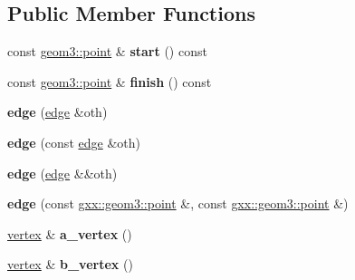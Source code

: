 \subsection*{Public Member Functions}
\begin{DoxyCompactItemize}
\item 
const \hyperlink{classgxx_1_1geom3_1_1point}{geom3\+::point} \& {\bfseries start} () const \hypertarget{classgxx_1_1topo_1_1edge_ae09c1e3d060f65a56834a53b79f34228}{}\label{classgxx_1_1topo_1_1edge_ae09c1e3d060f65a56834a53b79f34228}

\item 
const \hyperlink{classgxx_1_1geom3_1_1point}{geom3\+::point} \& {\bfseries finish} () const \hypertarget{classgxx_1_1topo_1_1edge_ae830c7645360da61e7ed4e8800b5c88b}{}\label{classgxx_1_1topo_1_1edge_ae830c7645360da61e7ed4e8800b5c88b}

\item 
{\bfseries edge} (\hyperlink{classgxx_1_1topo_1_1edge}{edge} \&oth)\hypertarget{classgxx_1_1topo_1_1edge_a4eac7d48227699ac0123224c16bde4d0}{}\label{classgxx_1_1topo_1_1edge_a4eac7d48227699ac0123224c16bde4d0}

\item 
{\bfseries edge} (const \hyperlink{classgxx_1_1topo_1_1edge}{edge} \&oth)\hypertarget{classgxx_1_1topo_1_1edge_aae36929460667329695131fbc85fcabc}{}\label{classgxx_1_1topo_1_1edge_aae36929460667329695131fbc85fcabc}

\item 
{\bfseries edge} (\hyperlink{classgxx_1_1topo_1_1edge}{edge} \&\&oth)\hypertarget{classgxx_1_1topo_1_1edge_a2efc46bf181954bbbf1ba7aef08f0bb5}{}\label{classgxx_1_1topo_1_1edge_a2efc46bf181954bbbf1ba7aef08f0bb5}

\item 
{\bfseries edge} (const \hyperlink{classgxx_1_1geom3_1_1point}{gxx\+::geom3\+::point} \&, const \hyperlink{classgxx_1_1geom3_1_1point}{gxx\+::geom3\+::point} \&)\hypertarget{classgxx_1_1topo_1_1edge_a1f6393a212c2315d95bbd942430028f0}{}\label{classgxx_1_1topo_1_1edge_a1f6393a212c2315d95bbd942430028f0}

\item 
\hyperlink{classgxx_1_1topo_1_1vertex}{vertex} \& {\bfseries a\+\_\+vertex} ()\hypertarget{classgxx_1_1topo_1_1edge_a90804962042e437b606ced0d67331bb3}{}\label{classgxx_1_1topo_1_1edge_a90804962042e437b606ced0d67331bb3}

\item 
\hyperlink{classgxx_1_1topo_1_1vertex}{vertex} \& {\bfseries b\+\_\+vertex} ()\hypertarget{classgxx_1_1topo_1_1edge_a16c37b1aa7824ca7c6e59d9599bf096e}{}\label{classgxx_1_1topo_1_1edge_a16c37b1aa7824ca7c6e59d9599bf096e}


\end{DoxyCompactItemize}
